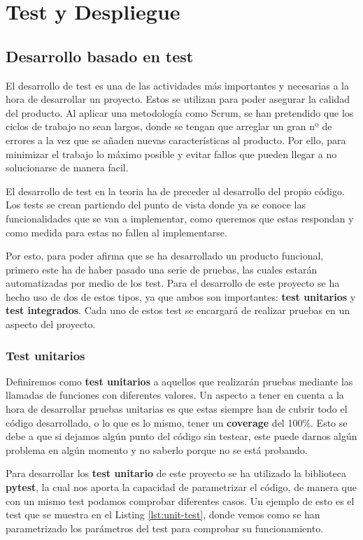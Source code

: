 \chapter{Test y Despliegue}

\section{Desarrollo basado en test}

El desarrollo de test es una de las actividades más importantes y necesarias a la hora de desarrollar un proyecto. Estos se utilizan para poder asegurar la calidad del producto. Al aplicar una metodología como Scrum, se han pretendido que los ciclos de trabajo no sean largos, donde se tengan que arreglar un gran nº de errores a la vez que se añaden nuevas características al producto. Por ello, para minimizar el trabajo lo máximo posible y evitar fallos que pueden llegar a no solucionarse de manera facil.

El desarrollo de test en la teoria ha de preceder al desarrollo del propio código. Los tests se crean partiendo del punto de vista donde ya se conoce las funcionalidades que se van a implementar, como queremos que estas respondan y como medida para estas no fallen al implementarse.

Por esto, para poder afirma que se ha desarrollado un producto funcional, primero este ha de haber pasado una serie de pruebas, las cuales estarán automatizadas por medio de los test. Para el desarrollo de este proyecto se ha hecho uso de dos de estos tipos, ya que ambos son importantes: \textbf{test unitarios} y \textbf{test integrados}. Cada uno de estos test se encargará de realizar pruebas en un aspecto del proyecto.

\subsection{Test unitarios}

Definiremos como \textbf{test unitarios} a aquellos que realizarán pruebas mediante las llamadas de funciones con diferentes valores. Un aspecto a tener en cuenta a la hora de desarrollar pruebas unitarias es que estas siempre han de cubrir todo el código desarrollado, o lo que es lo mismo, tener un \textbf{coverage} del 100\%. Esto se debe a que si dejamos algún punto del código sin testear, este puede darnos algún problema en algún momento y no saberlo porque no se está probando.

Para desarrollar los \textbf{test unitario} de este proyecto se ha utilizado la biblioteca \textbf{pytest}, la cual nos aporta la capacidad de parametrizar el código, de manera que con un mismo test podamos comprobar diferentes casos. Un ejemplo de esto es el test que se muestra en el Listing \ref{lst:unit-test}, donde vemos como se han parametrizado los parámetros del test para comprobar su funcionamiento.

